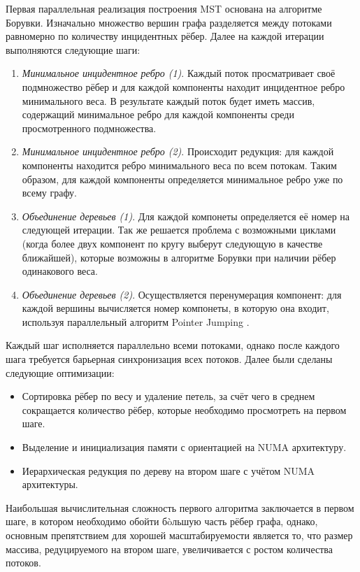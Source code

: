 \documentclass{article}
\begin{document}
Первая параллельная реализация построения MST основана на алгоритме Борувки. 
Изначально множество вершин графа разделяется между потоками равномерно по количеству инцидентных рёбер.
Далее на каждой итерации выполняются следующие шаги:
\begin{enumerate}
    \item \textit{Минимальное инцидентное ребро (1)}.
          Каждый поток просматривает своё подмножество рёбер и для каждой компоненты находит инцидентное ребро минимального веса. 
          В результате каждый поток будет иметь массив, содержащий минимальное ребро для каждой компоненты среди просмотренного подмножества.
    \item \textit{Минимальное инцидентное ребро (2)}.
          Происходит редукция: для каждой компоненты находится ребро минимального веса по всем потокам. 
          Таким образом, для каждой компоненты определяется минимальное ребро уже по всему графу.
    \item \textit{Объединение деревьев (1)}.
          Для каждой компонеты определяется её номер на следующей итерации.
          Так же решается проблема с возможными циклами (когда более двух компонент по кругу выберут следующую в качестве ближайшей), которые возможны в алгоритме Борувки при наличии рёбер одинакового веса.
    \item \textit{Объединение деревьев (2)}.
          Осуществляется перенумерация компонент: для каждой вершины вычисляется номер компонеты, в которую она входит, используя параллельный алгоритм Pointer Jumping \cite{pointer-jumping}.
\end{enumerate}
Каждый шаг исполняется параллельно всеми потоками, однако после каждого шага требуется барьерная синхронизация всех потоков.
Далее были сделаны следующие оптимизации:
\begin{itemize}
    \item Сортировка рёбер по весу и удаление петель, за счёт чего в среднем сокращается количество рёбер, которые необходимо просмотреть на первом шаге.
    \item Выделение и инициализация памяти с ориентацией на NUMA архитектуру.
    \item Иерархическая редукция по дереву на втором шаге с учётом NUMA архитектуры.
\end{itemize}




Наибольшая вычислительная сложность первого алгоритма заключается в первом шаге, в котором необходимо обойти б\`oльшую часть рёбер графа, однако, основным препятствием для хорошей масштабируемости является то, что размер массива, редуцируемого на втором шаге, увеличивается с ростом количества потоков.
\end{document}
